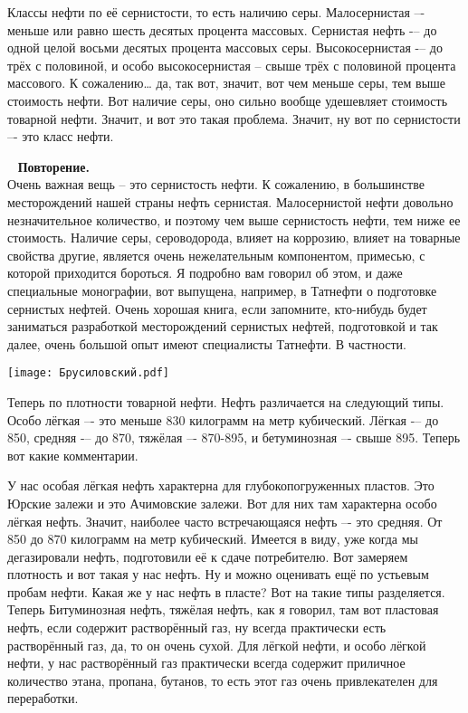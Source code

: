 \documentclass[main.tex]{subfiles}
\begin{document}
Классы нефти по её сернистости, то есть наличию серы.
Малосернистая –- меньше или равно шесть десятых процента массовых.
Сернистая нефть -– до одной целой восьми десятых процента массовых серы.
Высокосернистая -– до трёх с половиной, и особо высокосернистая – свыше трёх с половиной процента массового.
К сожалению… да, так вот, значит, вот чем меньше серы, тем выше стоимость нефти.
Вот наличие серы, оно сильно вообще удешевляет стоимость товарной нефти.
Значит, и вот это такая проблема.
Значит, ну вот по сернистости –- это класс нефти.

\ \newline
\textbf{Повторение.}\\
Очень важная вещь -- это сернистость нефти.
К сожалению, в большинстве месторождений нашей страны нефть сернистая.
Малосернистой нефти довольно незначительное количество, и поэтому чем выше сернистость нефти, тем ниже ее стоимость.
Наличие серы, сероводорода, влияет на коррозию, влияет на товарные свойства другие, является очень нежелательным компонентом, примесью, с которой приходится бороться.
Я подробно вам говорил об этом, и даже специальные монографии, вот выпущена, например, в Татнефти о подготовке сернистых нефтей.
Очень хорошая книга, если запомните, кто-нибудь будет заниматься разработкой месторождений сернистых нефтей, подготовкой и так далее, очень большой опыт имеют специалисты Татнефти. В частности.

\begin{center}
\texttt{[image: Брусиловский.pdf]}
\end{center}

Теперь по плотности товарной нефти.
Нефть различается на следующий типы.
Особо лёгкая –- это меньше 830 килограмм на метр кубический.
Лёгкая -– до 850, средняя -– до 870, тяжёлая –- 870-895, и бетуминозная –- свыше 895.
Теперь вот какие комментарии.

У нас особая лёгкая нефть характерна для глубокопогруженных пластов.
Это Юрские залежи и это Ачимовские залежи.
Вот для них там характерна особо лёгкая нефть.
Значит, наиболее часто встречающаяся нефть –- это средняя.
От 850 до 870 килограмм на метр кубический.
Имеется в виду, уже когда мы дегазировали нефть, подготовили её к сдаче потребителю.
Вот замеряем плотность и вот такая у нас нефть.
Ну и можно оценивать ещё по устьевым пробам нефти.
Какая же у нас нефть в пласте?
Вот на такие типы разделяется.
Теперь Битуминозная нефть, тяжёлая нефть, как я говорил, там вот пластовая нефть, если содержит растворённый газ, ну всегда практически есть растворённый газ, да, то он очень сухой.
Для лёгкой нефти, и особо лёгкой нефти, у нас растворённый газ практически всегда содержит приличное количество этана, пропана, бутанов, то есть этот газ очень привлекателен для переработки.
\end{document}
